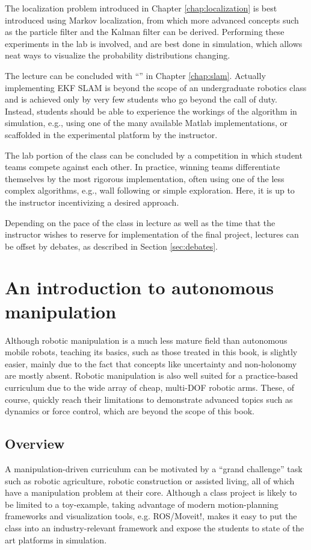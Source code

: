 \documentclass[paper=6.14in:9.21in,pagesize=pdftex,11pt,twoside,openright]{scrbook}
\begin{document}
The localization problem introduced in Chapter \ref{chap:localization} is best introduced using Markov localization, from which more advanced concepts such as the particle filter and the Kalman filter can be derived. Performing these experiments in the lab is involved, and are best done in simulation, which allows neat ways to visualize the probability distributions changing. 

The lecture can be concluded with ``'' in Chapter \ref{chap:slam}. Actually implementing EKF SLAM is beyond the scope of an undergraduate robotics class and is achieved only by very few students who go beyond the call of duty. Instead, students should be able to experience the workings of the algorithm in simulation, e.g., using one of the many available Matlab implementations, or scaffolded in the experimental platform by the instructor. 

The lab portion of the class can be concluded by a competition in which student teams compete against each other. In practice, winning teams differentiate themselves by the most rigorous implementation, often using one of the less complex algorithms, e.g., wall following or simple exploration. Here, it is up to the instructor incentivizing a desired approach. 

Depending on the pace of the class in lecture as well as the time that the instructor wishes to reserve for implementation of the final project, lectures can be offset by debates, as described in Section \ref{sec:debates}. 

\section{An introduction to autonomous manipulation}
Although robotic manipulation is a much less mature field than autonomous mobile robots, teaching its basics, such as those treated in this book, is slightly easier, mainly due to the fact that concepts like uncertainty and non-holonomy are mostly absent. Robotic manipulation is also well suited for a practice-based curriculum due to the wide array of cheap, multi-DOF robotic arms. These, of course, quickly reach their limitations to demonstrate advanced topics such as dynamics or force control, which are beyond the scope of this book.

\subsection{Overview} 
A manipulation-driven curriculum can be motivated by a ``grand challenge'' task such as robotic agriculture, robotic construction or assisted living, all of which have a manipulation problem at their core. Although a class project is likely to be limited to a toy-example, taking advantage of modern motion-planning frameworks and visualization tools, e.g. ROS/Moveit!, makes it easy to put the class into an industry-relevant framework and expose the students to state of the art platforms in simulation.
\end{document}
